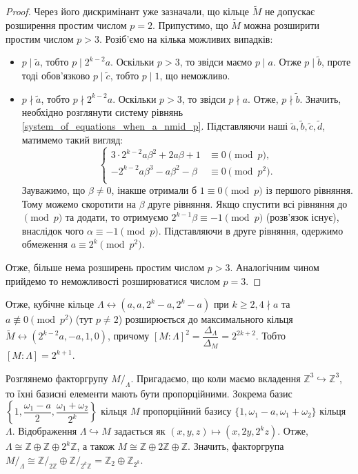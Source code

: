 \documentclass{thesis}
\begin{document}
\begin{proof}
Через його дискримінант уже зазначали, що кільце $\tilde{M}$ не допускає розширення простим числом $p = 2$. Припустимо, що $\tilde{M}$ можна розширити простим числом $p > 3$. Розіб'ємо на кілька можливих випадків:
\begin{itemize}
\item $p \mid \tilde{a}$, тобто $p \mid 2^{k-2}a$. Оскільки $p>3$, то звідси маємо $p \mid a$. Отже $p \mid \tilde{b}$, проте тоді обов'язково $p \mid \tilde{c}$, тобто $p \mid 1$, що неможливо.

\item $p \nmid \tilde{a}$, тобто $p \nmid 2^{k-2} a$. Оскільки $p>3$, то звідси $p \nmid a$. Отже, $p \nmid \tilde{b}$. Значить, необхідно розглянути систему рівнянь \eqref{system_of_equations_when_a_nmid_p}. Підставляючи наші $\tilde{a},\tilde{b},\tilde{c},\tilde{d}$, матимемо такий вигляд:
\begin{equation*}
\begin{cases}
3 \cdot 2^{k-2} a \beta^2  + 2a \beta + 1 & \equiv 0 \pmod p, \\
- 2^{k-2} a \beta^3 - a\beta^2 - \beta & \equiv 0 \pmod {p^2}. \\
\end{cases}
\end{equation*}
Зауважимо, що $\beta \neq 0$, інакше отримали б $1 \equiv 0 \pmod p$ із першого рівняння. Тому можемо скоротити на $\beta$ друге рівняння. Якщо спустити всі рівняння до $\pmod p$ та додати, то отримуємо $2^{k-1} \beta \equiv -1 \pmod p$ (розв'язок існує), внаслідок чого $\alpha \equiv -1 \pmod p$. Підставляючи в друге рівняння, одержимо обмеження $a \equiv 2^{k} \pmod {p^2}$.
\end{itemize}
Отже, більше нема розширень простим числом $p > 3$. Аналогічним чином прийдемо то неможливості розширюватися числом $p = 3$.
\end{proof}

Отже, кубічне кільце $\Lambda \leftrightarrow (a,a,2^k-a,2^k-a)$ при $k \geq 2, 4 \nmid a$ та $a \not\equiv 0 \pmod {p^2}$ (тут $p \neq 2$) розширюється до максимального кільця $\tilde{M} \leftrightarrow (2^{k-2}a, -a,1,0)$, причому $[M:\Lambda]^2 = \dfrac{\Delta_\Lambda}{\Delta_M} = 2^{2k+2}$. Тобто $[M:\Lambda] = 2^{k+1}$.

Розглянемо факторгрупу $M/_\Lambda$. Пригадаємо, що коли маємо вкладення $\mathbb{Z}^3 \hookrightarrow \mathbb{Z}^3$, то їхні базисні елементи мають бути пропорційними. Зокрема базис $\left\{ 1, \dfrac{\omega_1 - a}{2}, \dfrac{\omega_1+\omega_2}{2^k} \right\}$ кільця $M$ пропорційний базису $\{1,\omega_1-a,\omega_1+\omega_2\}$ кільця $\Lambda$. Відображення $\Lambda \hookrightarrow M$ задається як $(x,y,z) \mapsto (x,2y, 2^k z)$. Отже, $\Lambda \cong \mathbb{Z} \oplus \mathbb{Z} \oplus 2^k \mathbb{Z}$, а також $M \cong \mathbb{Z} \oplus 2\mathbb{Z} \oplus \mathbb{Z}$. Значить, факторгрупа $M/_\Lambda \cong \mathbb{Z}/_{2\mathbb{Z}} \oplus \mathbb{Z}/_{2^k\mathbb{Z}} = \mathbb{Z}_2 \oplus \mathbb{Z}_{2^k}$.
\end{document}
